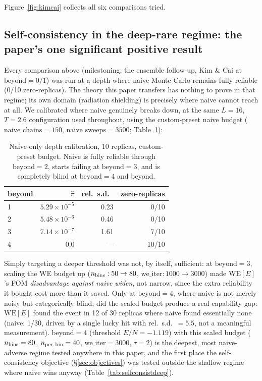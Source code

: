 \documentclass[a4paper,fleqn]{cas-sc}
\begin{document}
Figure~\ref{fig:kimcai} collects all six comparisons tried.

\subsection{Self-consistency in the deep-rare regime: the paper's one significant
	positive result}
\label{sec:deeprare}
Every comparison above (milestoning, the ensemble follow-up, Kim \& Cai at
$\mathrm{beyond}=0/1$) was run at a depth where naive Monte Carlo remains fully
reliable (0/10 zero-replicas). The theory this paper transfers has nothing to prove in
that regime; its own domain (radiation shielding) is precisely where naive cannot reach
at all. We calibrated where naive genuinely breaks down, at the same $L=16$, $T=2.6$
configuration used throughout, using the custom-preset naive budget
($\mathrm{naive\_chains}=150$, $\mathrm{naive\_sweeps}=3500$; Table~\ref{tab:deeprare}):

\begin{table}[h]
	\centering\small
	\caption{Naive-only depth calibration, 10 replicas, custom-preset budget. Naive is
		fully reliable through $\mathrm{beyond}=2$, starts failing at $\mathrm{beyond}=3$,
		and is completely blind at $\mathrm{beyond}=4$ and beyond.}
	\label{tab:deeprare}
	\begin{tabular}{lrrr}
		\toprule
		beyond & $\hat\pi$ & rel.\ s.d.\ & zero-replicas \\
		\midrule
		1 & $5.29\times10^{-5}$ & 0.23 & 0/10 \\
		2 & $5.48\times10^{-6}$ & 0.46 & 0/10 \\
		3 & $7.14\times10^{-7}$ & 1.61 & 7/10 \\
		4 & $0.0$ & --- & 10/10 \\
		\bottomrule
	\end{tabular}
\end{table}

Simply targeting a deeper threshold was not, by itself, sufficient: at $\mathrm{beyond}=3$,
scaling the WE budget up ($n_{\rm bins}:50\to80$, $\mathrm{we\_iter}:1000\to3000$) made
$\mathrm{WE}[E]$'s FOM \emph{disadvantage against naive widen}, not narrow, since the
extra reliability it bought cost more than it saved. Only at $\mathrm{beyond}=4$, where
naive is not merely noisy but categorically blind, did the scaled budget produce a real
capability gap: $\mathrm{WE}[E]$ found the event in 12 of 30 replicas where naive found
essentially none (naive: 1/30, driven by a single lucky hit with rel.\ s.d.\ $=5.5$, not
a meaningful measurement). $\mathrm{beyond}=4$ (threshold $E/N=-1.119$) with this scaled
budget ($n_{\rm bins}=80$, $n_{\rm per\ bin}=40$, $\mathrm{we\_iter}=3000$, $\tau=2$) is
the deepest, most naive-adverse regime tested anywhere in this paper, and the first
place the self-consistency objective (\S\ref{sec:objectives}) was tested outside the
shallow regime where naive wins anyway (Table~\ref{tab:selfconsistdeep}).
\end{document}
